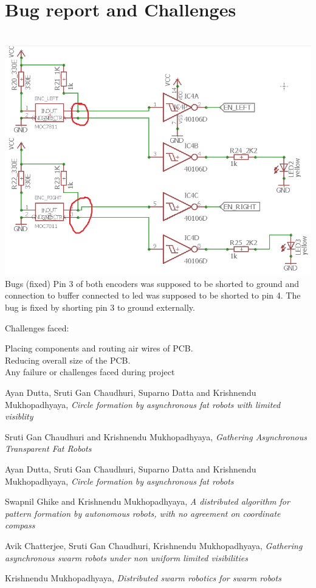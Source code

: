 \documentclass[a4paper,12pt,oneside]{book}
\begin{document}
\section{Bug report and Challenges}
\hfill\\
	\includegraphics[width=\textwidth]{./Capture2.png}
\hfill\\
Bugs (fixed)
Pin 3 of both encoders was supposed to be shorted to ground and connection to buffer connected to led was supposed to be shorted to pin 4. The bug is fixed by shorting pin 3 to ground externally.

Challenges faced:

Placing components and routing air wires of PCB.\\

Reducing overall size of the PCB.\\

Any failure or challenges faced during project

\begin{thebibliography}{li}
Ayan Dutta, Sruti Gan Chaudhuri, Suparno Datta and Krishnendu Mukhopadhyaya,
{\em Circle formation by asynchronous fat robots with limited visiblity}

Sruti Gan Chaudhuri and Krishnendu Mukhopadhyaya,
{\em Gathering Asynchronous Transparent Fat Robots}

Ayan Dutta, Sruti Gan Chaudhuri, Suparno Datta and Krishnendu Mukhopadhyaya,
{\em Circle formation by asynchronous fat robots}

Swapnil Ghike and Krishnendu Mukhopadhyaya,
{\em A distributed algorithm for pattern formation by autonomous robots, with no agreement on coordinate compass}

Avik Chatterjee, Sruti Gan Chaudhuri, Krishnendu Mukhopadhyaya,
{\em Gathering asynchronous swarm robots under non uniform limited visibilities}

Krishnendu Mukhopadhyaya,
{\em Distributed swarm robotics for swarm robots}
\end{thebibliography}
\end{document}
